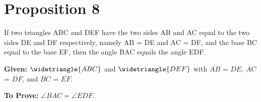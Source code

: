 
\section*{Proposition 8}

\begin{thm}
If two triangles ABC and DEF have the two sides AB and AC equal to the two sides DE and DF respectively, namely AB = DE and AC = DF, and the base BC equal to the base EF, then the angle BAC equals the angle EDF.
\end{thm}


\textbf{Given:} $\widetriangle{ABC}$ and $\widetriangle{DEF}$ with $\overline{AB}$ = $\overline{DE}$, $\overline{AC}$ = $\overline{DF}$, and $\overline{BC}$ = $\overline{EF}$.

\textbf{To Prove:} $\angle BAC = \angle EDF$.

\begin{figure}[H]
	\begin{subfigure}{0.35\textwidth}
		\caption{}
	\end{subfigure}
	\begin{subfigure} {0.35\textwidth}
		\caption{}
	\end{subfigure}
	\caption{}
\end{figure}

